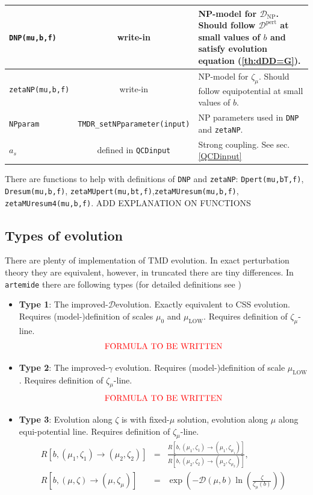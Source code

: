 \documentclass[prd,nofootinbib,eqsecnum,final]{revtex4}
\renewcommand{\(}{\left(}
\renewcommand{\)}{\right)}
\renewcommand{\[}{\left[}
\renewcommand{\]}{\right]}
\newcommand{\red}[1]{{\color[rgb]{1,0,0} #1}}
\begin{document}
\begin{center}
\begin{tabular}{||l|c|p{10cm}||}
\texttt{DNP(mu,b,f)} & write-in & NP-model for $\mathcal{D}_{\text{NP}}$. Should follow $\mathcal{D}^{\text{pert}}$ at small values of $b$ and satisfy evolution equation (\ref{th:dDD=G}).
\\\hline
\texttt{zetaNP(mu,b,f)} & write-in & NP-model for $\zeta_{\mu}$. Should follow equipotential at small values of $b$.
\\\hline
\texttt{NPparam} & \texttt{TMDR{\_}setNPparameter(input)} & NP parameters used in \texttt{DNP} and \texttt{zetaNP}.
\\\hline
$a_s$ & defined in \texttt{QCDinput} & Strong coupling. See sec.\ref{QCDinput}
\\
\hline\hline
\end{tabular}
\end{center}
There are functions to help with definitions of \texttt{DNP} and \texttt{zetaNP}: \texttt{Dpert(mu,bT,f)}, \texttt{Dresum(mu,b,f)}, \texttt{zetaMUpert(mu,bt,f)},\texttt{zetaMUresum(mu,b,f)}, \texttt{zetaMUresum4(mu,b,f)}. \red{ADD EXPLANATION ON FUNCTIONS}

\subsection{Types of evolution}

There are plenty of implementation of TMD evolution. In exact perturbation theory they are equivalent, however, in truncated there are tiny differences. In \texttt{artemide} there are following types (for detailed definitions see \cite{Scimemi:2018xaf})
\begin{itemize}
\item \textbf{Type 1}: The improved-$\mathcal{D}$evolution. Exactly equivalent to CSS evolution. Requires (model-)definition of scales $\mu_0$ and $\mu_{\text{LOW}}$. Requires definition of $\zeta_\mu$-line.
\begin{eqnarray}
\text{\red{FORMULA TO BE WRITTEN}}
\end{eqnarray}
\item \textbf{Type 2}: The improved-$\gamma$ evolution. Requires (model-)definition of scale $\mu_{\text{LOW}}$. Requires definition of $\zeta_\mu$-line.
\begin{eqnarray}
\text{\red{FORMULA TO BE WRITTEN}}
\end{eqnarray}
\item \textbf{Type 3}: Evolution along $\zeta$ is with fixed-$\mu$ solution, evolution along $\mu$ along equi-potential line. Requires definition of $\zeta_\mu$-line.
\begin{eqnarray}
R[b,(\mu_1,\zeta_1)\to(\mu_2,\zeta_2)]&=&\frac{R[b,(\mu_1,\zeta_1)\to(\mu_1,\zeta_{\mu_1})]}{R[b,(\mu_2,\zeta_2)\to(\mu_2,\zeta_{\mu_2})]},
\\
R[b,(\mu,\zeta)\to(\mu,\zeta_{\mu})]&=&\exp\(-\mathcal{D}(\mu,b)\ln\(\frac{\zeta}{\zeta_\mu(b)}\)\)
\end{eqnarray}
\end{itemize}
\end{document}
